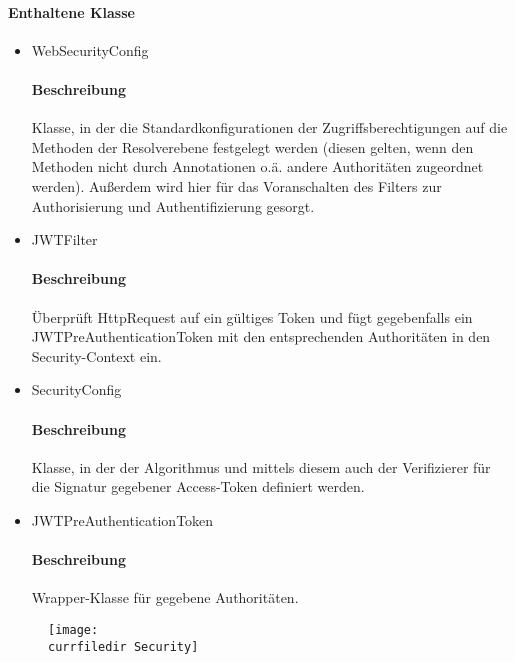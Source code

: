 \paragraph*{Enthaltene Klasse}
\begin{itemize}
	\item WebSecurityConfig
	\paragraph*{Beschreibung}
			Klasse, in der die Standardkonfigurationen der Zugriffsberechtigungen auf die Methoden 
			der Resolverebene festgelegt werden (diesen gelten, wenn den Methoden nicht durch Annotationen o.ä. andere
			Authoritäten zugeordnet werden). Außerdem wird hier für das Voranschalten des Filters zur Authorisierung und Authentifizierung gesorgt.
    \item JWTFilter
    		\paragraph*{Beschreibung}
    		Überprüft HttpRequest auf ein gültiges Token und fügt gegebenfalls ein JWTPreAuthenticationToken mit den entsprechenden Authoritäten in den Security-Context ein.
	\item SecurityConfig
			\paragraph*{Beschreibung}
			Klasse, in der der Algorithmus und mittels diesem auch der Verifizierer für die Signatur gegebener Access-Token definiert werden.		
	\item JWTPreAuthenticationToken
    		\paragraph*{Beschreibung}
			Wrapper-Klasse für gegebene Authoritäten.
\end{itemize}

\newpage
\begin{figure}
    \centering
    \texttt{[image: \\currfiledir Security]}
  \end{figure}